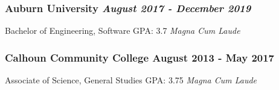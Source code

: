 \documentclass{article}
\begin{document}
\subsubsection*{\hspace*{0.15cm}Auburn University \hfill \textit{August 2017 - December 2019}}
\hspace*{0.15cm}Bachelor of Engineering, Software \hfill GPA: 3.7 \textit{Magna Cum Laude}
\subsubsection*{\hspace*{0.15cm}Calhoun Community College \hfill August 2013 - May 2017}
\hspace*{0.15cm}Associate of Science, General Studies \hfill GPA: 3.75 \textit{Magna Cum Laude}
\end{document}
